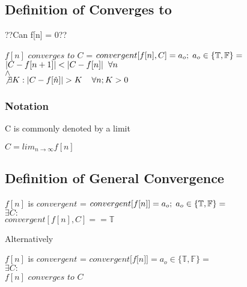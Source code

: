 \documentclass[11pt]{article}
\begin{document}
\subsection{Definition of Converges to}
??Can f[n] = 0??
\begin{center}
\vspace{1mm}
$f[n]$ $converges$ $to$ $C$ = $convergent [f [n],C] = a_o; \hspace{1mm} a_o \in \{\mathbb{T},\mathbb{F}\} =$
\\ \vspace{6mm}
$
|C - f[n+1]| < |C - f[n]| \hspace{2mm} \forall n
$
\\ \vspace{2mm}
$
\land
$
\\ \vspace{2mm}
$
\not \exists K : | C - f[\hat{n}] | > K \hspace{4mm} \forall n; K > 0
$
\end{center}

\subsubsection{Notation}
C is commonly denoted by a limit
\begin{center}
$
C = lim_{n \rightarrow \infty} f[n]
$
\end{center}

\subsection{Definition of General Convergence}
\begin{center}
\vspace{1mm}
$f[n]$ is $convergent$ = $convergent \lbrack f \lbrack n \rbrack \rbrack = a_o; \hspace{1mm} a_o \in \{\mathbb{T},\mathbb{F}\} =$
\\ \vspace{6mm}
$
\exists C :
$
\\ \vspace{2mm}
$convergent[f[n],C] == \mathbb{T}$
\end{center}
Alternatively
\begin{center}
\vspace{1mm}
$f[n]$ is $convergent$ = $convergent \lbrack f \lbrack n \rbrack \rbrack = a_o \in \{\mathbb{T},\mathbb{F}\} =$
\\ \vspace{2mm}
$
\exists C :
$
\\ \vspace{2mm}
$f[n]$ $converges$ $to$ $C$
\end{center}
\end{document}
